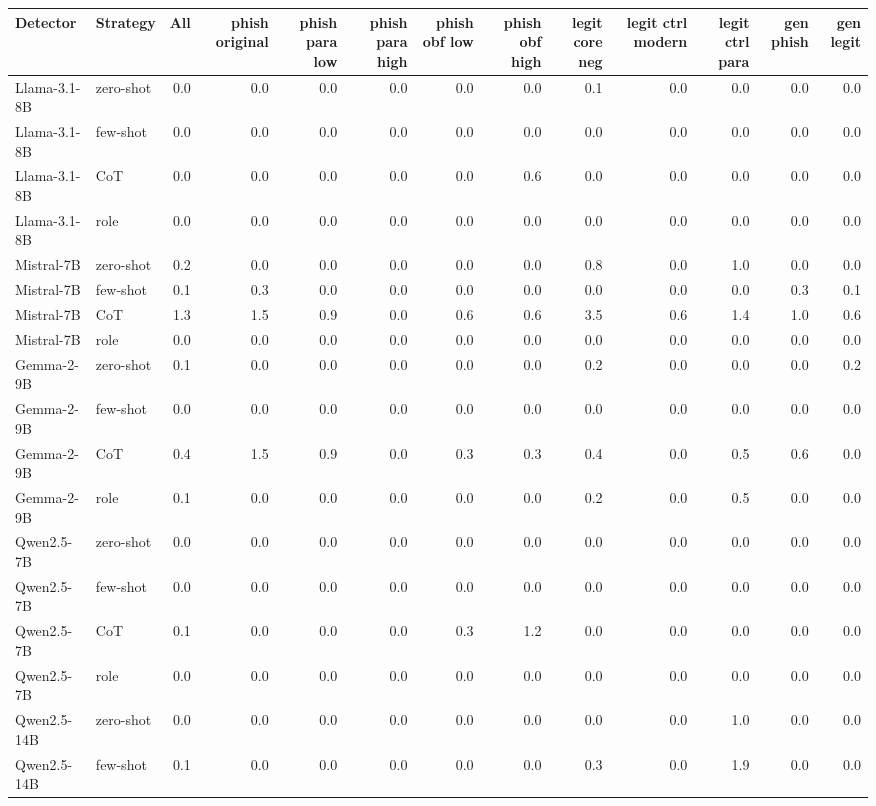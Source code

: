 \begin{tabular}{llrrrrrrrrrrr}
\toprule
Detector & Strategy & All & phish original & phish para low & phish para high & phish obf low & phish obf high & legit core neg & legit ctrl modern & legit ctrl para & gen phish & gen legit \\
\midrule
Llama-3.1-8B & zero-shot & 0.0 & 0.0 & 0.0 & 0.0 & 0.0 & 0.0 & 0.1 & 0.0 & 0.0 & 0.0 & 0.0 \\
Llama-3.1-8B & few-shot & 0.0 & 0.0 & 0.0 & 0.0 & 0.0 & 0.0 & 0.0 & 0.0 & 0.0 & 0.0 & 0.0 \\
Llama-3.1-8B & CoT & 0.0 & 0.0 & 0.0 & 0.0 & 0.0 & 0.6 & 0.0 & 0.0 & 0.0 & 0.0 & 0.0 \\
Llama-3.1-8B & role & 0.0 & 0.0 & 0.0 & 0.0 & 0.0 & 0.0 & 0.0 & 0.0 & 0.0 & 0.0 & 0.0 \\
Mistral-7B & zero-shot & 0.2 & 0.0 & 0.0 & 0.0 & 0.0 & 0.0 & 0.8 & 0.0 & 1.0 & 0.0 & 0.0 \\
Mistral-7B & few-shot & 0.1 & 0.3 & 0.0 & 0.0 & 0.0 & 0.0 & 0.0 & 0.0 & 0.0 & 0.3 & 0.1 \\
Mistral-7B & CoT & 1.3 & 1.5 & 0.9 & 0.0 & 0.6 & 0.6 & 3.5 & 0.6 & 1.4 & 1.0 & 0.6 \\
Mistral-7B & role & 0.0 & 0.0 & 0.0 & 0.0 & 0.0 & 0.0 & 0.0 & 0.0 & 0.0 & 0.0 & 0.0 \\
Gemma-2-9B & zero-shot & 0.1 & 0.0 & 0.0 & 0.0 & 0.0 & 0.0 & 0.2 & 0.0 & 0.0 & 0.0 & 0.2 \\
Gemma-2-9B & few-shot & 0.0 & 0.0 & 0.0 & 0.0 & 0.0 & 0.0 & 0.0 & 0.0 & 0.0 & 0.0 & 0.0 \\
Gemma-2-9B & CoT & 0.4 & 1.5 & 0.9 & 0.0 & 0.3 & 0.3 & 0.4 & 0.0 & 0.5 & 0.6 & 0.0 \\
Gemma-2-9B & role & 0.1 & 0.0 & 0.0 & 0.0 & 0.0 & 0.0 & 0.2 & 0.0 & 0.5 & 0.0 & 0.0 \\
Qwen2.5-7B & zero-shot & 0.0 & 0.0 & 0.0 & 0.0 & 0.0 & 0.0 & 0.0 & 0.0 & 0.0 & 0.0 & 0.0 \\
Qwen2.5-7B & few-shot & 0.0 & 0.0 & 0.0 & 0.0 & 0.0 & 0.0 & 0.0 & 0.0 & 0.0 & 0.0 & 0.0 \\
Qwen2.5-7B & CoT & 0.1 & 0.0 & 0.0 & 0.0 & 0.3 & 1.2 & 0.0 & 0.0 & 0.0 & 0.0 & 0.0 \\
Qwen2.5-7B & role & 0.0 & 0.0 & 0.0 & 0.0 & 0.0 & 0.0 & 0.0 & 0.0 & 0.0 & 0.0 & 0.0 \\
Qwen2.5-14B & zero-shot & 0.0 & 0.0 & 0.0 & 0.0 & 0.0 & 0.0 & 0.0 & 0.0 & 1.0 & 0.0 & 0.0 \\
Qwen2.5-14B & few-shot & 0.1 & 0.0 & 0.0 & 0.0 & 0.0 & 0.0 & 0.3 & 0.0 & 1.9 & 0.0 & 0.0 \\

\end{tabular}
